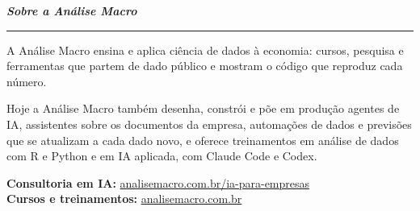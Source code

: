 \clearpage
\thispagestyle{empty}
\vspace*{\fill}
\begin{minipage}{0.86\textwidth}
{\color[HTML]{0A1A3C}\LARGE\bfseries\itshape Sobre a Análise Macro\par}
\vspace{4pt}
{\color[HTML]{1CA0D8}\rule{28mm}{2.2pt}}\par
\vspace{12pt}
{\color[HTML]{3A4658}
A Análise Macro ensina e aplica ciência de dados à economia: cursos, pesquisa e ferramentas que partem de dado
público e mostram o código que reproduz cada número.\par
\vspace{8pt}
Hoje a Análise Macro também desenha, constrói e põe em produção agentes de IA, assistentes sobre os documentos da
empresa, automações de dados e previsões que se atualizam a cada dado novo, e oferece treinamentos em análise de
dados com R e Python e em IA aplicada, com Claude Code e Codex.\par}
\vspace{12pt}
{\small\color[HTML]{0A1A3C}\textbf{Consultoria em IA:} \href{https://analisemacro.com.br/ia-para-empresas/}{analisemacro.com.br/ia-para-empresas}\\[2pt]
\textbf{Cursos e treinamentos:} \href{https://analisemacro.com.br}{analisemacro.com.br}\par}
\end{minipage}
\vspace*{\fill}

